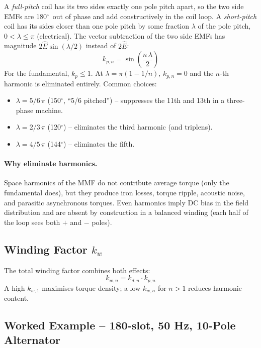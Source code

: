 \documentclass[12pt,a4paper]{article}
\newcommand{\degree}{\ensuremath{^{\circ}}}
\begin{document}
A \emph{full-pitch} coil has its two sides exactly one pole pitch
apart, so the two side EMFs are 180\degree\ out of phase and add
constructively in the coil loop.
A \emph{short-pitch} coil has its sides closer than one pole pitch by
some fraction $\lambda$ of the pole pitch, $0 < \lambda \le \pi$
(electrical). The vector subtraction of the two side EMFs has
magnitude $2\hat{E}\sin(\lambda/2)$ instead of $2\hat{E}$:
\begin{equation}
  k_{p,n} = \sin\!\left(\frac{n\,\lambda}{2}\right)
  \label{eq:kp}
\end{equation}
For the fundamental, $k_p \le 1$.
At $\lambda = \pi(1 - 1/n)$, $k_{p,n} = 0$ and the $n$-th harmonic is
eliminated entirely.
Common choices:
\begin{itemize}[noitemsep]
  \item $\lambda = 5/6\,\pi$ (150\degree, ``5/6 pitched'') --
        suppresses the 11th and 13th in a three-phase machine.
  \item $\lambda = 2/3\,\pi$ (120\degree) -- eliminates the third
        harmonic (and triplens).
  \item $\lambda = 4/5\,\pi$ (144\degree) -- eliminates the fifth.
\end{itemize}

\paragraph{Why eliminate harmonics.}
Space harmonics of the MMF do not contribute average torque (only the
fundamental does), but they produce iron losses, torque ripple,
acoustic noise, and parasitic asynchronous torques. Even harmonics
imply DC bias in the field distribution and are absent by construction
in a balanced winding (each half of the loop sees both $+$ and $-$
poles).

\subsection{Winding Factor $k_w$}

The total winding factor combines both effects:
\begin{equation}
  k_{w,n} = k_{d,n}\cdot k_{p,n}
  \label{eq:kw}
\end{equation}
A high $k_{w,1}$ maximises torque density; a low $k_{w,n}$
for $n>1$ reduces harmonic content.

\subsection{Worked Example -- 180-slot, 50 Hz, 10-Pole Alternator}
\end{document}
